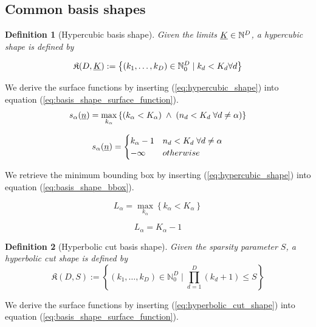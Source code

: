 \documentclass{article}
\newtheorem*{definition}{Definition}
\begin{document}
\subsection{Common basis shapes}
\begin{definition}[Hypercubic basis shape]
  Given the limits \(\underline{K} \in \mathbb{N}^D\), a hypercubic shape is defined by

  \begin{equation}
    \label{eq:hypercubic_shape}
    \mathfrak{K}(D,\underline{K}):=\left\{(k_1,\dots,k_D) \in \mathbb{N}_0^D \;|\; k_d < K_d \forall d\right\}
  \end{equation}
\end{definition}

We derive the surface functions by inserting (\ref{eq:hypercubic_shape}) into
equation
(\ref{eq:basis_shape_surface_function}).
\[
  s_{\alpha}(\underline{n})=\max_{k_{\alpha}}\left\{(k_{\alpha}<K_{\alpha}) \;\land\;
    (n_d < K_d \;\forall d \neq \alpha)\right\}
\]

\begin{equation}
  s_{\alpha}(\underline{n})=
  \begin{cases}
    k_{\alpha}-1 & n_d < K_d \;\forall d \neq \alpha \\
    -\infty & otherwise \\
  \end{cases}
\end{equation}

We retrieve the minimum bounding box by inserting (\ref{eq:hypercubic_shape}) into
equation
(\ref{eq:basis_shape_bbox}).

\[
L_{\alpha}=\max_{k_{\alpha}}\left\{k_{\alpha}<K_{\alpha}\right\}
\]

\begin{equation}
L_{\alpha}=K_{\alpha}-1
\end{equation}

\begin{definition}[Hyperbolic cut basis shape]
  Given the sparsity parameter \(S\), a hyperbolic cut shape is defined by
  \begin{equation}
    \mathfrak{K}(D,S):=\left\{(k_1,\dots,k_D) \in \mathbb{N}_0^D \;|\;\prod_{d=1}^D(k_d+1) \leq S\right\}
    \label{eq:hyperbolic_cut_shape}
  \end{equation}
\end{definition}

We derive the surface functions by inserting (\ref{eq:hyperbolic_cut_shape}) into
equation (\ref{eq:basis_shape_surface_function}).
\end{document}
